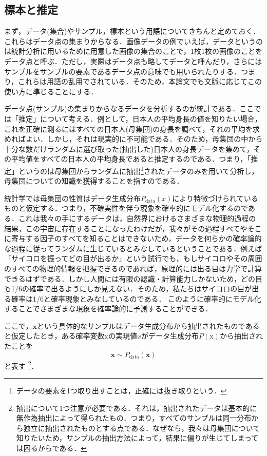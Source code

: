 \documentclass[a4paper,11pt]{jsreport}
\begin{document}
\subsection{標本と推定}
まず，データ(集合)やサンプル，標本という用語についてきちんと定めておく．これらはデータ点の集まりからなる．画像データの例でいえば，データというのは統計分析に用いるために用意した画像の集合のことで，1枚1枚の画像のことをデータ点と呼ぶ．ただし，実際はデータ点も略してデータと呼んだり，さらにはサンプルをサンプルの要素であるデータ点の意味でも用いられたりする．つまり，これらは用語の乱用でされている．そのため，本論文でも文脈に応じてこの使い方に準じることにする．\par
データ点(サンプル)の集まりからなるデータを分析するのが統計である．ここでは「推定」について考える．例として，日本人の平均身長の値を知りたい場合，これを正確に測るにはすべての日本人(母集団)の身長を調べて，それの平均を求めればよい．しかし，それは現実的に不可能である．そのため，母集団の中から十分な数だけランダムに選び取った(抽出した)日本人の身長データを集めて，その平均値をすべての日本人の平均身長であると推定するのである．つまり，「推定」というのは母集団からランダムに抽出\footnote{データの要素を1つ取り出すことは，正確には抜き取りという．}されたデータのみを用いて分析し，母集団についての知識を獲得することを指すのである．\par
統計学では母集団の性質はデータ生成分布$P_{\text{data}}({x})$により特徴づけられているものと仮定する．つまり，不確実性を伴う現象を確率的にモデル化するのである．これは我々の手にするデータは，自然界におけるさまざまな物理的過程の結果，この宇宙に存在することになったわけだが，我々がその過程すべてやそこに寄与する因子のすべてを知ることはできないため，データを何らかの確率論的な過程に従ってランダムに生じているとみなしているということである．例えば「サイコロを振ってどの目が出るか」という試行でも，もしサイコロやその周囲のすべての物理的情報を把握できるのであれば，原理的には出る目は力学で計算できるはずである．しかし人間には有限の認識・計算能力しかないため，どの目も1/6の確率で出るようにしか見えない．そのため，私たちはサイコロの目が出る確率は1/6と確率現象とみなしているのである．
このように確率的にモデル化することでさまざまな現象を確率論的に予測することができる．\par
ここで，$\bm{x}$という具体的なサンプルはデータ生成分布から抽出されたものであると仮定したとき，ある確率変数$\mathrm{x}$の実現値$x$がデータ生成分布$P(\mathrm{x})$から抽出されたことを
\begin{equation}
  \bm{x} \sim P_{\text{data}}(\mathbf{x})
\end{equation}
と表す
\footnote{抽出について1つ注意が必要である．それは，抽出されたデータは基本的に無作為抽出によって得られたもの．つまり，すべてのサンプルは同一分布から独立に抽出されたものとする点である．なぜなら，我々は母集団について知りたいため，サンプルの抽出方法によって，結果に偏りが生じてしまっては困るからである．}．\par
\end{document}

